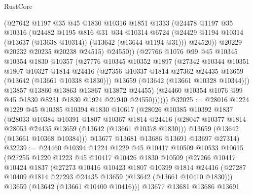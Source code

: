 \begin{lexlean}{RustCore}
\begin{coremodule}
                (@27642
                  @1197
                  @35
                  @45
                  @1830
                  @10316
                  @1851
                  @1333
                  (@24478
                    @1197
                    @35
                    @10316
                    (@24482
                      @1195
                      @816
                      @31
                      @34
                      @10314
                      @6724
                      (@24429 @1194 @10314 (@13637 (@13638 @10314)) (@13642 (@13644 @1194 @31)))
                      @24520))
                  @20229
                  @20232
                  @20235
                  @20238
                  @24515)
                @24550))
            (@27766
              @1076
              @99
              @45
              @10345
              @10354
              @1830
              @10357
              (@27776
                @10345
                @10352
                @1897
                (@27342
                  @10344
                  @10351
                  @1807
                  @10327
                  @1814
                  @24416
                  (@27356 @10337 @1814 @27362 @24435 @13659 (@13642 (@13661 @10338 @1830)))
                  @13659
                  (@13642 (@13661 @10328 @10344)))
                @13857
                @13860
                @13863
                @13867
                @13872
                @24455)
              (@24460 @10354 @1076 @99 @45 @1830 @8231 @1830 @1924 @27940 @24550))))))
@32025 := @28016
    @1224
    @1229
    @45
    @10385
    @10394
    @1830
    @10617
    (@28026
      @10385
      @10392
      @1837
      (@28033
        @10384
        @10391
        @1807
        @10367
        @1814
        @24416
        (@28047 @10377 @1814 @28053 @24435 @13659 (@13642 (@13661 @10378 @1830)))
        @13659
        (@13642 (@13661 @10368 @10384)))
      @13677
      @13681
      @13686
      @13691
      @13697
      @27314)
@32239 := @24460
    @10394
    @1224
    @1229
    @45
    @10417
    @10509
    @10533
    @10615
    (@27255
      @1220
      @1223
      @45
      @10417
      @10426
      @1830
      @10509
      (@27266
        @10417
        @10424
        @1837
        (@27273
          @10416
          @10423
          @1807
          @10399
          @1814
          @24416
          (@27287 @10409 @1814 @27293 @24435 @13659 (@13642 (@13661 @10410 @1830)))
          @13659
          (@13642 (@13661 @10400 @10416)))
        @13677
        @13681
        @13686
        @13691

\end{coremodule}
\end{lexlean}
